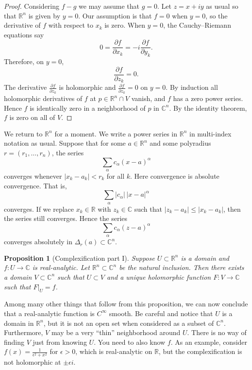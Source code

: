 \documentclass[12pt,openany]{book}
\newcommand{\sabs}[1]{\lvert {#1} \rvert}
\newcommand{\C}{{\mathbb{C}}}
\newcommand{\R}{{\mathbb{R}}}
\theoremstyle{plain}
\newtheorem{prop}[thm]{Proposition}
\theoremstyle{remark}
\theoremstyle{definition}
\theoremstyle{exercise}
\theoremstyle{example}
\begin{document}
\begin{proof}
Considering $f-g$ we may assume that $g=0$.
Let $z = x+iy$ as usual so that $\R^n$ is given by $y=0$.
Our assumption is that $f = 0$ when $y=0$,
so the derivative of $f$ with respect to $x_k$ is zero.
When $y=0$,
the Cauchy--Riemann equations say
\begin{equation*}
0 = \frac{\partial f}{\partial x_k} =
-i \frac{\partial f}{\partial y_k} .
\end{equation*}
Therefore, on $y=0$,
\begin{equation*}
\frac{\partial f }{\partial z_k} = 0 .
\end{equation*}
The derivative $\frac{\partial f }{\partial z_k}$ is holomorphic
and $\frac{\partial f }{\partial z_k} = 0$ on $y=0$.
By induction all holomorphic derivatives of $f$ at $p \in \R^n \cap V$ vanish,
and $f$ has a zero
power series.  Hence $f$ is identically zero in a neighborhood of
$p$ in $\C^n$.
By the identity theorem, $f$ is zero on all of $V$.
\end{proof}


We return to $\R^n$ for a moment.
We write a power series in $\R^n$ in multi-index notation as usual.
Suppose that for some
$a \in \R^n$
and some polyradius
$r=(r_1,\ldots,r_n)$,
the series
\begin{equation*}
\sum_{\alpha} c_{\alpha} {(x-a)}^\alpha
\end{equation*}
converges whenever $\sabs{x_k-a_k} < r_k$ for all $k$.
Here convergence is absolute convergence.  That is,
\begin{equation*}
\sum_{\alpha} \sabs{c_{\alpha}}\, \sabs{x-a}^\alpha
\end{equation*}
converges.
If we replace $x_k \in \R$ with $z_k \in \C$ such that
$\sabs{z_k-a_k} \leq \sabs{x_k-a_k}$, then the series still converges.
Hence the series
\begin{equation*}
\sum_{\alpha} c_{\alpha} {(z-a)}^\alpha
\end{equation*}
converges absolutely in $\Delta_r(a) \subset \C^n$.

\begin{prop}[Complexification part I]
Suppose $U \subset \R^n$ is a domain and
$f \colon U \to \C$ is real-analytic.
Let $\R^n \subset \C^n$ be the natural inclusion.
Then there exists a domain $V \subset \C^n$ such that $U \subset V$
and a unique holomorphic function $F \colon V \to \C$ such that $F|_U = f$.
\end{prop}

Among many other things that follow from this proposition, we
can now conclude that a real-analytic function is $C^\infty$ smooth.  Be careful
and notice that $U$ is a domain in $\R^n$, but it is not an open set
when considered as a subset of $\C^n$.  Furthermore, $V$ may be a very
``thin'' neighborhood around $U$.  There is no way of finding $V$ just from
knowing $U$.  You need to also know $f$.
As an example, consider
$f(x) = \frac{1}{\epsilon^2+x^2}$ for $\epsilon > 0$, which is
real-analytic on $\R$, but the complexification is not holomorphic at $\pm
\epsilon i$.
\end{document}
